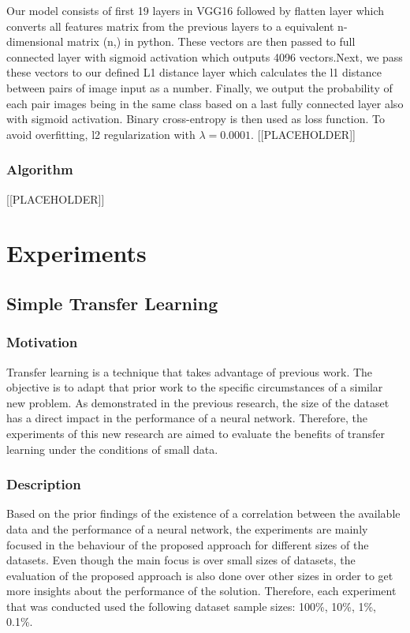 \documentclass{article}
\begin{document}
Our model consists of first 19 layers in VGG16 followed by flatten layer which converts all features matrix from the previous layers to a equivalent n-dimensional matrix (n,) in python. These vectors are then passed to full connected layer with sigmoid activation which outputs 4096 vectors.Next, we pass these vectors to our defined L1 distance layer which calculates the l1 distance between pairs of image input as a number. Finally, we output the probability of each pair images being in the same class based on a last fully connected layer also with sigmoid activation. Binary cross-entropy is then used as loss function. To avoid overfitting, l2 regularization with $\lambda=0.0001$. 
[[PLACEHOLDER]]

\subsubsection{\textbf{Algorithm}}

[[PLACEHOLDER]]

\section{Experiments}
\label{sec:experiments}

\subsection{Simple Transfer Learning}

\subsubsection{\textbf{Motivation}}

Transfer learning is a technique that takes advantage of previous work. The objective is to adapt that prior work to the specific circumstances of a similar new problem. As demonstrated in the previous research, the size of the dataset has a direct impact in the performance of a neural network. Therefore, the experiments of this new research are aimed to evaluate the benefits of transfer learning under the conditions of small data.

\subsubsection{\textbf{Description}}

Based on the prior findings of the existence of a correlation between the available data and the performance of a neural network, the experiments are mainly focused in the behaviour of the proposed approach for different sizes of the datasets. Even though the main focus is over small sizes of datasets, the evaluation of the proposed approach is also done over other sizes in order to get more insights about the performance of the solution. Therefore, each experiment that was conducted used the following dataset sample sizes: 100\%, 10\%, 1\%, 0.1\%.
\end{document}
